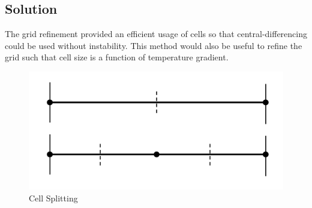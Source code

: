 \documentclass[12pt,twocolumn]{article}
\begin{document}
\subsection*{Solution}
The grid refinement provided an efficient usage of cells so that central-differencing could be used without instability.
This method would also be useful to refine the grid such that cell size is a function of temperature gradient.

\begin{figure}
\includegraphics[width=\columnwidth]{plots/cellsplitting.png}
\caption{Cell Splitting}
\label{fig:cellsplitting}
\end{figure}
\end{document}
